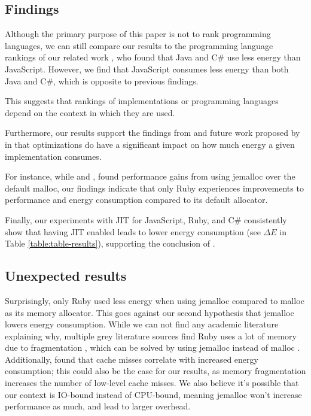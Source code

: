 \documentclass[main.tex]{subfiles}
\begin{document}
\subsection{Findings}

Although the primary purpose of this paper is not to rank programming languages, we can still compare our results to the programming language rankings of our related work \cite{pereira2017energy, Pereira_Couto_Ribeiro_Rua_Cunha_Fernandes_Saraiva_2021, Couto_Pereira_Ribeiro_Rua_Saraiva_2017}, who found that Java and C\# use less energy than JavaScript. However, we find that JavaScript consumes less energy than both Java and C\#, which is opposite to previous findings. 

This suggests that rankings of implementations or programming languages depend on the context in which they are used.

Furthermore, our results support the findings from \textcite{Kempen_Kwon_Nguyen_Berger_2024} and future work proposed by \textcite{Pfeiffer_Offenberg_Pedersen_Landsgaard_Karlsen, Pfeiffer_Trindade_Meding_Harwick} in that optimizations do have a significant impact on how much energy a given implementation consumes. 

For instance, while \textcite{Li_Wu_Kavi_Mehta_Yadwadkar_John_2023} and \textcite{Lamprakos_Papadopoulos_Catthoor_Soudris_2022}, found performance gains from using jemalloc over the default malloc, our findings indicate that only Ruby experiences improvements to performance and energy consumption compared to its default allocator.

Finally, our experiments with JIT for JavaScript, Ruby, and C\# consistently show that having JIT enabled leads to lower energy consumption (see $\Delta E$ in Table \ref{table:table-results}), supporting the conclusion of  \textcite{Stoico_Dragomir_Lago_2025, Ournani_Belgaid_Rouvoy_Rust_Penhoat_2021, Hu_John_2006}.

\subsection{Unexpected results}
Surprisingly, only Ruby used less energy when using jemalloc compared to malloc as its memory allocator. This goes against our second hypothesis that jemalloc lowers energy consumption. While we can not find any academic literature explaining why, multiple grey literature sources find Ruby uses a lot of memory due to fragmentation \cite{ruby-developer-memory-fragmentation, ruby-memory-fargmentation-joyfulbikesheddingWhatCauses}, which can be solved by using jemalloc instead of malloc \cite{ruby-jemalloc-fix, ruby-sidekiq-jemalloc}. Additionally, \textcite{Kempen_Kwon_Nguyen_Berger_2024} found that cache misses correlate with increased energy consumption; this could also be the case for our results, as memory fragmentation increases the number of low-level cache misses. We also believe it's possible that our context is IO-bound instead of CPU-bound, meaning jemalloc won't increase performance as much, and lead to larger overhead.
\end{document}
